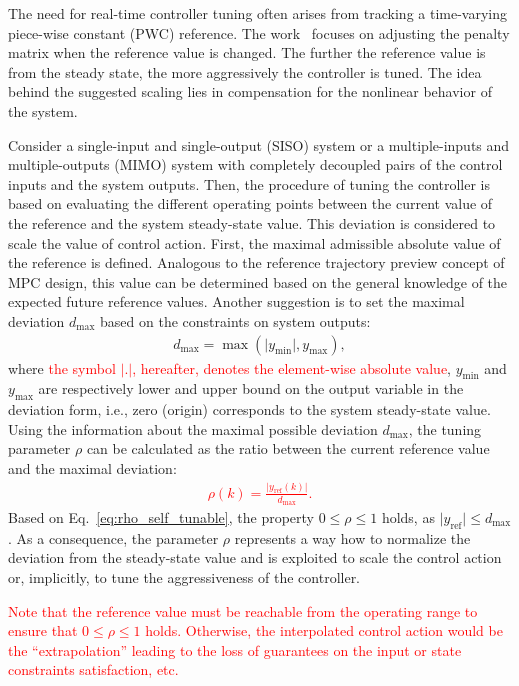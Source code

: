 \documentclass[preprint,12pt]{elsarticle}
\newcommand{\change}[1]{\textcolor{red}{#1}}
\begin{document}
	The need for real-time controller tuning often arises from tracking a time-varying piece-wise constant (PWC) reference. The work~\cite{self_tunable} focuses on adjusting the penalty matrix when the reference value is changed. The further the reference value is from the steady state, the more aggressively the controller is tuned. The idea behind the suggested scaling lies in compensation for the nonlinear behavior of the system.  
	
	Consider a single-input and single-output (SISO) system or a multiple-inputs and multiple-outputs (MIMO) system with completely decoupled pairs of the control inputs and the system outputs. 
	Then, the procedure of tuning the controller is based on evaluating the different operating points between the current value of the reference and the system steady-state value. This deviation is considered to scale the value of control action. First, the maximal admissible absolute value of the reference is defined. Analogous to the reference trajectory preview concept of MPC design, this value can be determined based on the general knowledge of the expected future reference values. Another suggestion is to set the maximal deviation $d_{\max}$ based on the constraints on system outputs: 	
	\begin{eqnarray}
		\label{eq:d_max}
		d_{\max} = \max(\vert y_{\min} \vert, y_{\max}),
	\end{eqnarray}	
	where \change{the symbol $\lvert.\rvert$, hereafter, denotes the element-wise absolute value}, $y_{\min}$ and $y_{\max}$ are respectively lower and upper bound on the output variable in the deviation form, i.e., zero (origin) corresponds to the system steady-state value. Using the information about the maximal possible deviation $d_{\max}$, the tuning parameter $\rho$ can be calculated as the ratio between the current reference value and the maximal deviation: 
	\change{ 
	\begin{eqnarray}
		\label{eq:rho_self_tunable}
		\rho (k) = \frac{\vert y_{\mathrm{ref}}(k) \vert}{d_{\max}}.
	\end{eqnarray}
	}
	Based on Eq.~\eqref{eq:rho_self_tunable}, the property $0 \le \rho \le 1$ holds, as $\vert y_{\mathrm{ref}} \vert \le d_{\max}$. As a consequence, the parameter $\rho$ represents a way how to normalize the deviation from the steady-state value and is exploited to scale the control action or, implicitly, to tune the aggressiveness of the controller. 
	
	\change{Note that the reference value must be reachable from the operating range to ensure that $0 \le \rho \le 1 $ holds. Otherwise, the interpolated control action would be the ``extrapolation'' leading to the loss of guarantees on the input or state constraints satisfaction, etc.} 
	
\end{document}

